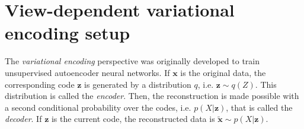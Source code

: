 \documentclass[12pt,twoside,openright]{article}
\begin{document}
\section{View-dependent variational encoding setup}\label{app:VFE}
{\color{Purple} 
	The \emph{variational encoding} perspective \citep{hinton1994autoencoders} was originally developed 
	to train unsupervised autoencoder neural networks. 
	If $\boldsymbol{x}$ is the original data, the corresponding code $\boldsymbol{z}$ is generated by a distribution $q$, i.e. $\boldsymbol{z} \sim q(Z)$. This distribution is called the \emph{encoder}. Then, the reconstruction is made possible with a second conditional probability over the codes, i.e. $p(X|\boldsymbol{z})$, that is called the \emph{decoder}. If $\boldsymbol{z}$ is the current code, the reconstructed data is $\tilde{\boldsymbol{x}} \sim p(X|\boldsymbol{z})$. 
	
}
\end{document}
